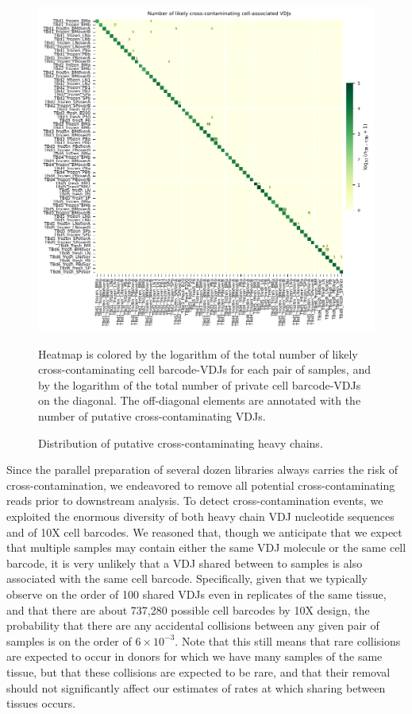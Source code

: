 \begin{figure}[h]
    \centering
    \includegraphics[width=\textwidth]{figs/Tabula_Bursa/SI/IGH_cross_contaminants_heatmap.pdf}
    \caption{Distribution of putative cross-contaminating heavy chains.}{Heatmap is colored by the logarithm of the total number of likely cross-contaminating cell barcode-VDJs for each pair of samples, and by the logarithm of the total number of private cell barcode-VDJs on the diagonal. The off-diagonal elements are annotated with the number of putative cross-contaminating VDJs.}
    \label{fig:IGH-cb_collision_numbers}
\end{figure}
\noindent Since the parallel preparation of several dozen libraries always carries the risk of cross-contamination, we endeavored to remove all potential cross-contaminating reads prior to downstream analysis. To detect cross-contamination events, we exploited the enormous diversity of both heavy chain VDJ nucleotide sequences and of 10X cell barcodes. We reasoned that, though we anticipate that we expect that multiple samples may contain either the same VDJ molecule or the same cell barcode, it is very unlikely that a VDJ shared between to samples is also associated with the same cell barcode. Specifically, given that we typically observe on the order of 100 shared VDJs even in replicates of the same tissue, and that there are about 737,280 possible cell barcodes by 10X design, the probability that there are any accidental collisions between any given pair of samples is on the order of $6 \times 10^{-3}$. Note that this still means that rare collisions are expected to occur in donors for which we have many samples of the same tissue, but that these collisions are expected to be rare, and that their removal should not significantly affect our estimates of rates at which sharing between tissues occurs.

